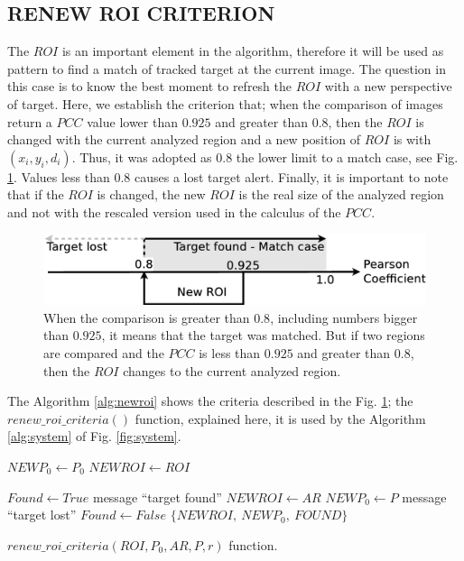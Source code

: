 \subsection{RENEW ROI CRITERION}
The $ROI$ is an important element in the algorithm, therefore it will be used
as pattern to find a match of tracked target at the current image. 
The  question in this case is to know the best moment to refresh the $ROI$
with a new perspective of target. 
Here, we establish the criterion that; when the comparison of images return 
a $PCC$ value lower than $0.925$ and greater than $0.8$, then the $ROI$ is changed with the current 
analyzed region and a new position of $ROI$ is with $(x_i,y_i,d_i)$. 
Thus, it was adopted as $0.8$ the lower limit to a match case\cite{Eugene},
see Fig. \ref{fig:newroicri}. Values less than $0.8$ causes a  lost target alert.
Finally, it is important to note that if the $ROI$ is changed, the new $ROI$ is 
the real size of the analyzed region and not with the rescaled version used
in the calculus of the $PCC$.


\begin{figure}[H]
\includegraphics[width=\columnwidth]{images/figure3.eps}
\caption{When the comparison is greater than $0.8$, including numbers bigger than 
$0.925$, it means that the target was matched. But if two regions are compared 
and the $PCC$ is less than $0.925$ and greater than $0.8$, 
then the $ROI$ changes to the current analyzed region.}
\label{fig:newroicri}
\end{figure}

The Algorithm \ref{alg:newroi} shows the criteria described in the
Fig. \ref{fig:newroicri}; the $renew\_roi\_criteria()$ function, explained here,
it is used by the Algorithm \ref{alg:system} of Fig. \ref{fig:system}.

\begin{algorithm}

    $NEWP_0 \leftarrow  P_0$ \;
    $NEWROI \leftarrow  ROI$ \;
    
    {
      $Found \leftarrow True$\;
        message ``target found''\;
        {
            $NEWROI \leftarrow  AR$\;
            $NEWP_0 \leftarrow  P$\;
        }
    }
    {
      message ``target lost''\;
      $Found \leftarrow False$\;
    }
\Return  $\{NEWROI,~NEWP_0,~FOUND\}$\;
\label{alg:newroi}
\caption{$renew\_roi\_criteria(ROI,P_0,AR,P,r)$ function.}
\end{algorithm}
